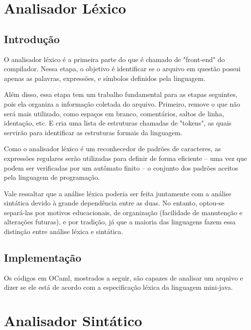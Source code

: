 \documentclass[12pt,a4paper,twoside]{report}
\begin{document}
\chapter{Analisador Léxico}

\section{Introdução}

O analisador léxico é a primeira parte do que é chamado de "front-end" do compilador. Nessa etapa, o objetivo é identificar se o arquivo em questão possui apenas as palavras, expressões, e símbolos definidos pela linguagem.

Além disso, essa etapa tem um trabalho fundamental para as etapas seguintes, pois ela organiza a informação coletada do arquivo. Primeiro, remove o que não será mais utilizado, como espaços em branco, comentários, saltos de linha, identação, etc. E cria uma lista de estruturas chamadas de "tokens", as quais servirão para identificar as estruturas formais da linguagem.

Como o analisador léxico é um reconhecedor de padrões de caracteres, as expressões regulares serão utilizadas para definir de forma eficiente – uma vez que podem ser verificadas por um autômato finito – o conjunto dos padrões aceitos pela linguagem de programação.

Vale ressaltar que a análise léxica poderia ser feita juntamente com a análise sintática devido à grande dependência entre as duas. No entanto, optou-se separá-las por motivos educacionais, de organização (facilidade de manutenção e alterações futuras), e por tradição, já que a maioria das linguagens fazem essa distinção entre análise léxica e sintática.

\section{Implementação}

Os códigos em OCaml, mostrados a seguir, são capazes de analisar um arquivo e dizer se ele está de acordo com a especificação léxica da linguagem mini-java.






\chapter{Analisador Sintático}
\end{document}
